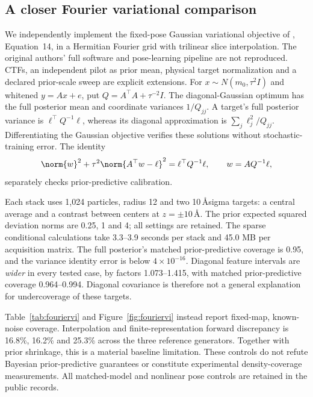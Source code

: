 \subsection{A closer Fourier variational comparison}
We independently implement the fixed-pose Gaussian variational objective of
\citet{ullrich2020}, Equation~14, in a Hermitian Fourier grid with trilinear
slice interpolation. The original authors' full software and pose-learning
pipeline are not reproduced. CTFs, an independent pilot as prior mean, physical
target normalization and a declared prior-scale sweep are explicit extensions.
For $x\sim N(m_0,\tau^2I)$ and whitened $y=Ax+e$, put
$Q=A^\top A+\tau^{-2}I$. The diagonal-Gaussian optimum has the full posterior
mean and coordinate variances $1/Q_{jj}$. A target's full posterior variance
is $\ell^\top Q^{-1}\ell$, whereas its diagonal approximation is
$\sum_j\ell_j^2/Q_{jj}$. Differentiating the Gaussian objective verifies these
solutions without stochastic-training error. The identity
\[
 \norm{w}^2+\tau^2\norm{A^\top w-\ell}^2
   =\ell^\top Q^{-1}\ell,\qquad w=AQ^{-1}\ell,
\]
separately checks prior-predictive calibration.

Each stack uses 1,024 particles, radius 12 and two 10\,\AA\-sigma targets:
a central average and a contrast between centers at $z=\pm10$\,\AA.
The prior expected squared deviation norms are 0.25, 1 and 4; all settings
are retained. The sparse conditional calculations take 3.3--3.9 seconds per
stack and 45.0 MB per acquisition matrix. The full posterior's matched
prior-predictive coverage is 0.95, and the variance identity error is below
$4\times10^{-16}$. Diagonal feature intervals are \emph{wider} in every tested
case, by factors 1.073--1.415, with matched prior-predictive coverage
0.964--0.994. Diagonal covariance is therefore not a general explanation for
undercoverage of these targets.

Table~\ref{tab:fouriervi} and Figure~\ref{fig:fouriervi} instead report
fixed-map, known-noise coverage. Interpolation and finite-representation forward
discrepancy is 16.8\%, 16.2\% and 25.3\% across the three reference generators.
Together with prior shrinkage, this is a material baseline limitation. These
controls do not refute Bayesian prior-predictive guarantees or constitute
experimental density-coverage measurements. All matched-model and nonlinear
pose controls are retained in the public records.

